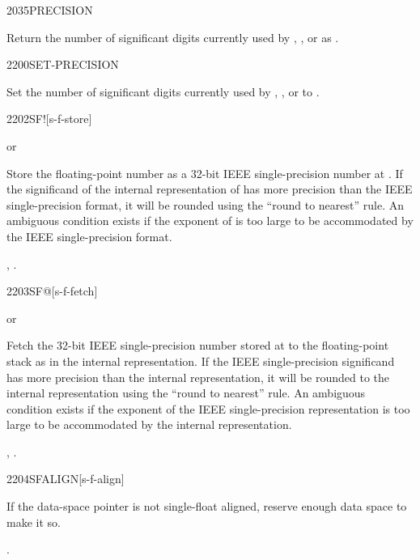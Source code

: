 \begin{worddef}{2035}{PRECISION}
\item {}

	Return the number of significant digits currently used by
	, , or  as .
\end{worddef}


\begin{worddef}{2200}{SET-PRECISION}
\item {}

	Set the number of significant digits currently used by ,
	, or  to .
\end{worddef}


\begin{worddef}{2202}{SF!}[s-f-store]
\item {}  or

	Store the floating-point number  as a 32-bit IEEE
	single-precision number at . If the significand
	of the internal representation of  has more precision
	than the IEEE single-precision format, it will be rounded using
	the ``round to nearest'' rule. An ambiguous condition exists if
	the exponent of  is too large to be accommodated by the
	IEEE single-precision format.

\see {},
	.
\end{worddef}


\begin{worddef}{2203}{SF@}[s-f-fetch]
\item {}  or

	Fetch the 32-bit IEEE single-precision number stored at
	 to the floating-point stack as  in the
	internal representation. If the IEEE single-precision
	significand has more precision than the internal representation,
	it will be rounded to the internal representation using the
	``round to nearest'' rule. An ambiguous condition exists if the
	exponent of the IEEE single-precision representation is too
	large to be accommodated by the internal representation.

\see {},
	.
\end{worddef}


\begin{worddef}{2204}{SFALIGN}[s-f-align]
\item \stack{}{}

	If the data-space pointer is not single-float aligned, reserve
	enough data space to make it so.

\see {}.
\end{worddef}


